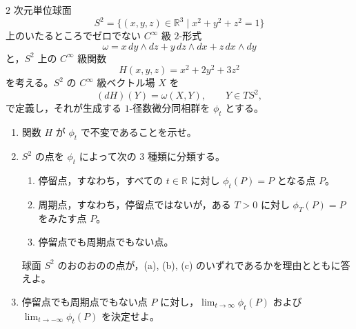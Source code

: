 \documentclass[12pt]{jlreq}
\newcommand{\R}{\mathbb{R}}
\begin{document}
\(2\) 次元単位球面
\[
  S^2=\{(x,y,z)\in\R^3\mid x^2+y^2+z^2=1\}
\]
上のいたるところでゼロでない \(C^\infty\) 級 \(2\)-形式
\[
  \omega=x\,dy\wedge dz+y\,dz\wedge dx+z\,dx\wedge dy
\]
と，\(S^2\) 上の \(C^\infty\) 級関数
\[
  H(x,y,z)=x^2+2y^2+3z^2
\]
を考える。\(S^2\) の \(C^\infty\) 級ベクトル場 \(X\) を
\[
  (dH)(Y)=\omega(X,Y),\qquad Y\in TS^2,
\]
で定義し，それが生成する \(1\)-径数微分同相群を \(\phi_t\) とする。

\begin{enumerate}
  \item 関数 \(H\) が \(\phi_t\) で不変であることを示せ。
  \item \(S^2\) の点を \(\phi_t\) によって次の \(3\) 種類に分類する。
  \begin{enumerate}
    \item 停留点，すなわち，すべての \(t\in\R\) に対し \(\phi_t(P)=P\) となる点 \(P\)。
    \item 周期点，すなわち，停留点ではないが，ある \(T>0\) に対し \(\phi_T(P)=P\) をみたす点 \(P\)。
    \item 停留点でも周期点でもない点。
  \end{enumerate}
  球面 \(S^2\) のおのおのの点が，(a), (b), (c) のいずれであるかを理由とともに答えよ。
  \item 停留点でも周期点でもない点 \(P\) に対し，\(\displaystyle\lim_{t\to\infty}\phi_t(P)\) および \(\displaystyle\lim_{t\to-\infty}\phi_t(P)\) を決定せよ。
\end{enumerate}
\end{document}
